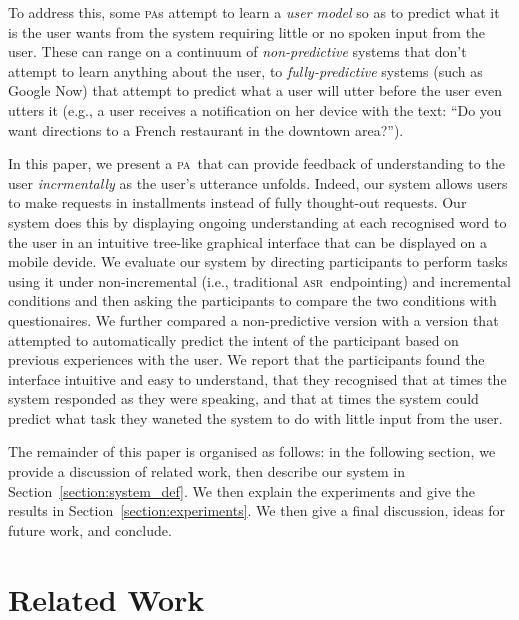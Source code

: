 \documentclass[11pt]{article}
\newcommand{\asr}[0]{\textsc{asr}}
\newcommand{\pa}[0]{\textsc{pa}}
\begin{document}
To address this, some \pa s attempt to learn a \emph{user model} so as to predict what it is the user wants from the system requiring little or no spoken input from the user. These can range on a continuum of \emph{non-predictive} systems that don't attempt to learn anything about the user, to \emph{fully-predictive} systems (such as Google Now) that attempt to predict what a user will utter before the user even utters it (e.g., a user receives a notification on her device with the text: ``Do you want directions to a French restaurant in the downtown area?''). 

In this paper, we present a \pa\ that can provide feedback of understanding to the user \emph{incrmentally} as the user's utterance unfolds. Indeed, our system allows users to make requests in installments instead of fully thought-out requests. Our system does this by displaying ongoing understanding at each recognised word to the user in an intuitive tree-like graphical interface that can be displayed on a mobile devide. We evaluate our system by directing participants to perform tasks using it under non-incremental (i.e., traditional \asr\ endpointing) and incremental conditions and then asking the participants to compare the two conditions with questionaires. We further compared a non-predictive version with a version that attempted to automatically predict the intent of the participant based on previous experiences with the user. We report that the participants found the interface intuitive and easy to understand, that they recognised that at times the system responded as they were speaking, and that at times the system could predict what task they waneted the system to do with little input from the user. 

The remainder of this paper is organised as follows: in the following section, we provide a discussion of related work, then describe our system in Section~\ref{section:system_def}. We then explain the experiments and give the results in Section~\ref{section:experiments}. We then give a final discussion, ideas for future work, and conclude. 


\section{Related Work}
\label{section:related_work}
\end{document}
